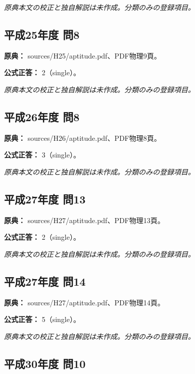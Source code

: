 \par\textit{原典本文の校正と独自解説は未作成。分類のみの登録項目。}

\subsection{平成25年度 問8}
\label{q:h25-reg-apt-08}

\noindent\textbf{原典：} sources/H25/aptitude.pdf、PDF物理9頁。

\textbf{公式正答：} 2（single）。

\par\textit{原典本文の校正と独自解説は未作成。分類のみの登録項目。}

\subsection{平成26年度 問8}
\label{q:h26-reg-apt-08}

\noindent\textbf{原典：} sources/H26/aptitude.pdf、PDF物理8頁。

\textbf{公式正答：} 3（single）。

\par\textit{原典本文の校正と独自解説は未作成。分類のみの登録項目。}

\subsection{平成27年度 問13}
\label{q:h27-reg-apt-13}

\noindent\textbf{原典：} sources/H27/aptitude.pdf、PDF物理13頁。

\textbf{公式正答：} 2（single）。

\par\textit{原典本文の校正と独自解説は未作成。分類のみの登録項目。}

\subsection{平成27年度 問14}
\label{q:h27-reg-apt-14}

\noindent\textbf{原典：} sources/H27/aptitude.pdf、PDF物理14頁。

\textbf{公式正答：} 5（single）。

\par\textit{原典本文の校正と独自解説は未作成。分類のみの登録項目。}

\subsection{平成30年度 問10}
\label{q:h30-reg-apt-10}

